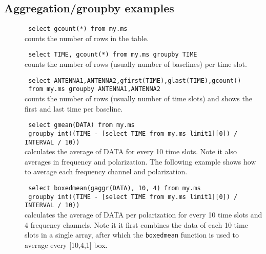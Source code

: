 \subsection{\label{TAQL:AGGREXAMPLES}Aggregation/groupby examples}
\begin{description}
  \item[] \texttt{ select gcount(*) from my.ms }
      \\counts the number of rows in the table.

  \item[] \texttt{ select TIME, gcount(*) from my.ms groupby TIME }
      \\counts the number of rows (usually number of baselines) per time slot.

  \item[] \texttt{ select ANTENNA1,ANTENNA2,gfirst(TIME),glast(TIME),gcount() }
    \\\texttt{ from my.ms groupby ANTENNA1,ANTENNA2 }
      \\counts the number of rows (usually number of time slots) and
      shows the first and last time per baseline.

  \item[] \texttt{ select gmean(DATA) from my.ms }
    \\\texttt{ groupby int((TIME - [select TIME from my.ms limit1][0]) / INTERVAL / 10)) }
      \\ calculates the average of DATA for every 10 time slots. Note it
      also averages in frequency and polarization. The following example
      shows how to average each frequency channel and polarization.

  \item[] \texttt{ select boxedmean(gaggr(DATA), 10, 4) from my.ms }
    \\\texttt{ groupby int((TIME - [select TIME from my.ms limit1][0]) / INTERVAL / 10)) }
      \\ calculates the average of DATA per polarization for every 10
      time slots and 4 frequency channels. Note it it first combines
      the data of each 10 time slots in a single array, after which
      the \texttt{boxedmean} function is used to average every
      [10,4,1] box.
\end{description}



